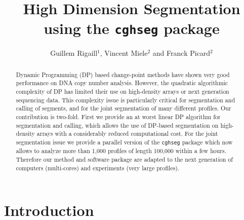 \documentclass[11pt]{llncs}
\begin{document}
\title{High Dimension Segmentation using the \texttt{cghseg} package}
%
%
\author{Guillem Rigaill$^1$, Vincent Miele$^2$ and Franck Picard$^2$}
%
%
%

\maketitle   

\begin{abstract}
  Dynamic Programming (DP) based change-point methods have shown very good performance on DNA copy number analysis. However, the quadratic algorithmic complexity of DP has limited their use on high-density arrays or next generation sequencing data. This complexity issue is particularly critical for segmentation and calling of segments, and for the joint segmentation of many different profiles. Our contribution is two-fold. First we provide an at worst linear DP algorithm for segmentation and calling, which allows the use of DP-based segmentation on high-density arrays with a considerably reduced computational cost. For the joint segmentation issue we provide a parallel version of the \texttt{cghseg} package which now allows to analyze more than 1,000 profiles of length 100,000 within a few hours. Therefore our method and software package are adapted to the next generation of computers (multi-cores) and experiments (very large profiles).
\end{abstract}


\newpage
\section{Introduction}
\end{document}
